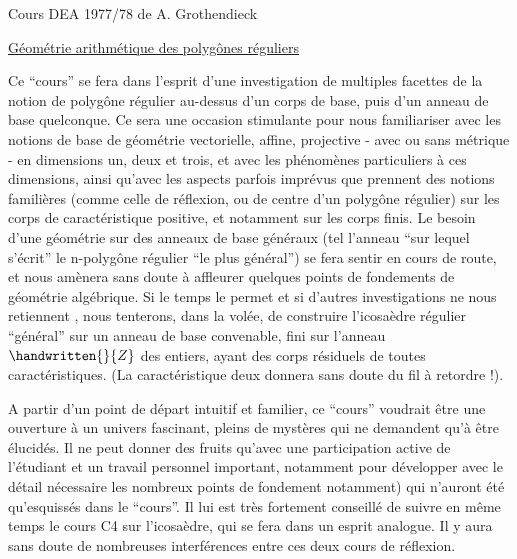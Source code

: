 \begin{center}
Cours DEA 1977/78 de A. Grothendieck

\uline{Géométrie arithmétique des polygônes réguliers}
\end{center}

{\reversemarginpar\margin{\handwritten{!}}\normalmarginpar}%
Ce ``cours'' se fera dans l'esprit d'une investigation  de multiples facettes de la notion de polygône régulier au-dessus d'un corps de base, puis d'un anneau de base quelconque. Ce sera une occasion stimulante pour nous familiariser avec les notions de base de géométrie vectorielle, affine, projective - avec ou sans métrique - en dimensions un, deux et trois, et avec les phénomènes particuliers à ces dimensions, ainsi qu'avec les aspects parfois imprévus que prennent des notions familières (comme celle de réflexion, ou de centre d'un polygône régulier) sur les corps de caractéristique positive, et notamment sur les corps finis. Le besoin d'une géométrie sur des anneaux de base généraux (tel l'anneau ``sur lequel s'écrit'' le $\mathrm{n}$-polygône régulier ``le plus général'') se fera sentir en cours de route, et nous amènera sans doute à affleurer quelques points de fondements de géométrie algébrique. Si le temps le permet et si d'autres investigations ne nous retiennent , nous tenterons, dans la volée, de construire l'icosaèdre régulier ``général'' sur un anneau de base convenable, fini sur l'anneau \hspace{.5em}${\handwritten{\mathbb}{Z}}$ \hspace{.5em}des entiers, ayant des corps résiduels de toutes caractéristiques. (La caractéristique deux \hspace{.5em}donnera sans doute du fil à retordre !).

A partir d'un point de départ intuitif et familier, ce ``cours'' voudrait être une ouverture à un univers fascinant, pleins de mystères qui ne demandent qu'à être élucidés. Il ne peut donner des fruits qu'avec une participation active de l'étudiant et un travail personnel important, notamment pour développer avec le détail nécessaire les nombreux points \handwritten{(}de fondement notamment) qui n'auront été qu'esquissés dans le ``cours''. Il lui est très fortement conseillé de suivre en même temps le cours \hspace{.5em}C4 \hspace{.5em}sur l'icosaèdre, qui se fera dans un esprit analogue. Il y aura sans doute de nombreuses interférences entre ces deux cours de réflexion.


